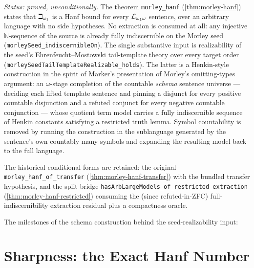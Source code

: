 \emph{Status: proved, unconditionally.}  The theorem \texttt{morley\_hanf}
(\ref{thm:morley-hanf}) states that $\beth_{\omega_1}$ is a Hanf bound for
every $\mathcal{L}_{\omega_1\omega}$ sentence, over an arbitrary language with no side
hypotheses.  No extraction is consumed at all: any injective
$\mathbb{N}$-sequence of the source is already fully indiscernible on the
Morley seed (\texttt{morleySeed\_indiscernibleOn}).  The single substantive
input is realizability of the seed's Ehrenfeucht--Mostowski tail-template
theory over every target order
(\texttt{morleySeedTailTemplateRealizable\_holds}).  The latter is a
Henkin-style construction in the spirit of Marker's presentation of Morley's
omitting-types argument: an $\omega$-stage completion of the countable
\emph{schema} sentence universe --- deciding each lifted template sentence and
pinning a disjunct for every positive countable disjunction and a refuted
conjunct for every negative countable conjunction --- whose quotient term model
carries a fully indiscernible sequence of Henkin constants satisfying a
restricted truth lemma.  Symbol countability is removed by running the
construction in the sublanguage generated by the sentence's own countably many
symbols and expanding the resulting model back to the full language.

The historical conditional forms are retained: the original
\texttt{morley\_hanf\_of\_transfer} (\ref{thm:morley-hanf-transfer}) with the
bundled transfer hypothesis, and the split bridge
\texttt{hasArbLargeModels\_of\_restricted\_extraction}
(\ref{thm:morley-hanf-restricted}) consuming the (since refuted-in-ZFC)
full-indiscernibility extraction residual plus a compactness oracle.


The milestones of the schema construction behind the seed-realizability input:







\section{Sharpness: the Exact Hanf Number}

